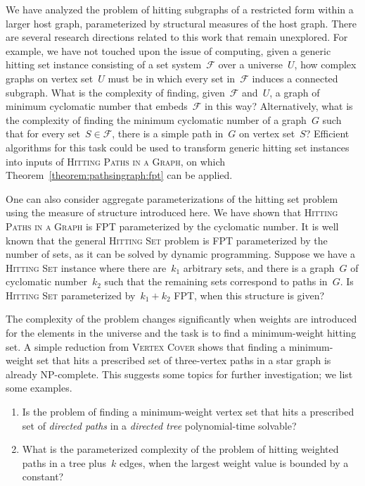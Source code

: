 \let\accentvec\vec  \documentclass{llncs}
\newcommand{\F}{\ensuremath{\mathcal{F}}\xspace}
\newcommand{\HitPathsInGraph}{\textsc{Hitting Paths in a Graph}\xspace}
\newcommand{\VertexCover}{\textsc{Vertex Cover}\xspace}
\newcommand{\HittingSet}{\textsc{Hitting Set}\xspace}
\begin{document}
We have analyzed the problem of hitting subgraphs of a restricted form within a larger host graph, parameterized by structural measures of the host graph. There are several research directions related to this work that remain unexplored. For example, we have not touched upon the issue of computing, given a generic hitting set instance consisting of a set system~$\F$ over a universe~$U$, how complex graphs on vertex set~$U$ must be in which every set in~$\F$ induces a connected subgraph. What is the complexity of finding, given~$\F$ and~$U$, a graph of minimum cyclomatic number that embeds~$\F$ in this way? Alternatively, what is the complexity of finding the minimum cyclomatic number of a graph~$G$ such that for every set~$S \in \F$, there is a simple path in~$G$ on vertex set~$S$? Efficient algorithms for this task 
could be used to transform generic hitting set instances into inputs of \HitPathsInGraph, on which Theorem~\ref{theorem:pathsingraph:fpt} can be applied.

One can also consider aggregate parameterizations of the hitting set problem using the measure of structure introduced here. We have shown that \HitPathsInGraph is FPT parameterized by the cyclomatic number. It is well known that the general \HittingSet problem is FPT parameterized by the number of sets, as it can be solved by dynamic programming. Suppose we have a \HittingSet instance where there are~$k_1$ arbitrary sets, and there is a graph~$G$ of cyclomatic number~$k_2$ such that the remaining sets correspond to paths in~$G$. Is \HittingSet parameterized by~$k_1+k_2$ FPT, when this structure is given?

The complexity of the problem changes significantly when weights are introduced for the elements in the universe and the task is to find a minimum-weight hitting set. A simple reduction from \VertexCover shows that finding a minimum-weight set that hits a prescribed set of three-vertex paths in a star graph is already NP-complete. This suggests some topics for further investigation; we list some examples.

\begin{enumerate}
	\item Is the problem of finding a minimum-weight vertex set that hits a prescribed set of \emph{directed paths} in a \emph{directed tree} polynomial-time solvable?
	\item What is the parameterized complexity of the problem of hitting weighted paths in a tree plus~$k$ edges, when the largest weight value is bounded by a constant?
\end{enumerate}
\end{document}
